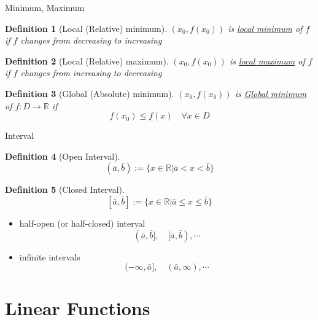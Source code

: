 \documentclass[a4paper,11pt]{article}
\newtheorem{defn}{Definition}
\begin{document}
\begin{frame}[t]{Minimum, Maximum}
	\begin{defn}
		[Local (Relative) minimum]
		$(x_0,f(x_0))$ is \uline{local minimum} of $f$ if $f$ changes from decreasing to increasing
	\end{defn}
	
	\begin{defn}
		[Local (Relative) maximum]
		$(x_0,f(x_0))$ is \uline{local maximum} of $f$ if $f$ changes from increasing to decreasing
	\end{defn}
	
	\begin{defn}
		[Global (Absolute) minimum]
		$(x_0,f(x_0))$ is \uline{Global minimum} of $f:D\rightarrow \mathbb{R}$ if \[
			f(x_0)\le f(x) \quad \forall x \in D
		\]
	\end{defn}
\end{frame}

\begin{frame}[t]{Interval}
	\begin{defn}
		[Open Interval]
		\[
			(\bar a,\bar b):=\{x\in \mathbb{R}\vert \bar a < x < \bar b \}
		\]
	\end{defn}
	
	\begin{defn}
		[Closed Interval]
		\[
			[\bar a,\bar b]:=\{x\in \mathbb{R}\vert \bar a \le x \le  \bar b \}
		\]
	\end{defn}
	
	\begin{itemize}
		\item half-open (or half-closed) interval
		\[
			(\bar a, \bar b],\quad [\bar a, \bar b),\cdots
		\]
		\item infinite intervals
		\[
			(-\infty, \bar a],\quad (\bar a, \infty),\cdots
		\]
	\end{itemize}
\end{frame}

\section{Linear Functions} %
\label{sec:linear_functions}
\end{document}
